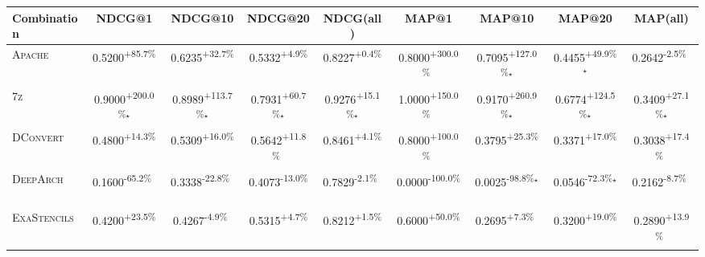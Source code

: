 \begin{table}[htbp]
\centering
\renewcommand{\arraystretch}{1.2}
\begin{tabular}{l|cccc|cccc}
\hline
Combination & NDCG@1 & NDCG@10 & NDCG@20 & NDCG(all) & MAP@1 & MAP@10 & MAP@20 & MAP(all) \\ \hline
\textsc{Apache} & \cellcolor{green!30}0.5200\textsuperscript{+85.7\%}$^{\,\,\,}$ & \cellcolor{green!30}0.6235\textsuperscript{+32.7\%}$^{\,\,\,}$ & \cellcolor{green!30}0.5332\textsuperscript{+4.9\%}$^{\,\,\,}$ & \cellcolor{green!30}0.8227\textsuperscript{+0.4\%}$^{\,\,\,}$ & \cellcolor{green!30}0.8000\textsuperscript{+300.0\%}$^{\,\,\,}$ & \cellcolor{green!30}0.7095\textsuperscript{+127.0\%}$^\star$ & \cellcolor{green!30}0.4455\textsuperscript{+49.9\%}$^\star$ & \cellcolor{red!30}0.2642\textsuperscript{-2.5\%}$^{\,\,\,}$ \\
\textsc{7z} & \cellcolor{green!30}0.9000\textsuperscript{+200.0\%}$^\star$ & \cellcolor{green!30}0.8989\textsuperscript{+113.7\%}$^\star$ & \cellcolor{green!30}0.7931\textsuperscript{+60.7\%}$^\star$ & \cellcolor{green!30}0.9276\textsuperscript{+15.1\%}$^\star$ & \cellcolor{green!30}1.0000\textsuperscript{+150.0\%}$^{\,\,\,}$ & \cellcolor{green!30}0.9170\textsuperscript{+260.9\%}$^\star$ & \cellcolor{green!30}0.6774\textsuperscript{+124.5\%}$^\star$ & \cellcolor{green!30}0.3409\textsuperscript{+27.1\%}$^\star$ \\
\textsc{DConvert} & \cellcolor{green!30}0.4800\textsuperscript{+14.3\%}$^{\,\,\,}$ & \cellcolor{green!30}0.5309\textsuperscript{+16.0\%}$^{\,\,\,}$ & \cellcolor{green!30}0.5642\textsuperscript{+11.8\%}$^{\,\,\,}$ & \cellcolor{green!30}0.8461\textsuperscript{+4.1\%}$^{\,\,\,}$ & \cellcolor{green!30}0.8000\textsuperscript{+100.0\%}$^{\,\,\,}$ & \cellcolor{green!30}0.3795\textsuperscript{+25.3\%}$^{\,\,\,}$ & \cellcolor{green!30}0.3371\textsuperscript{+17.0\%}$^{\,\,\,}$ & \cellcolor{green!30}0.3038\textsuperscript{+17.4\%}$^{\,\,\,}$ \\
\textsc{DeepArch} & \cellcolor{red!30}0.1600\textsuperscript{-65.2\%}$^{\,\,\,}$ & \cellcolor{red!30}0.3338\textsuperscript{-22.8\%}$^{\,\,\,}$ & \cellcolor{red!30}0.4073\textsuperscript{-13.0\%}$^{\,\,\,}$ & \cellcolor{red!30}0.7829\textsuperscript{-2.1\%}$^{\,\,\,}$ & \cellcolor{red!30}0.0000\textsuperscript{-100.0\%}$^{\,\,\,}$ & \cellcolor{red!30}0.0025\textsuperscript{-98.8\%}$^\star$ & \cellcolor{red!30}0.0546\textsuperscript{-72.3\%}$^\star$ & \cellcolor{red!30}0.2162\textsuperscript{-8.7\%}$^{\,\,\,}$ \\
\textsc{ExaStencils} & \cellcolor{green!30}0.4200\textsuperscript{+23.5\%}$^{\,\,\,}$ & \cellcolor{red!30}0.4267\textsuperscript{-4.9\%}$^{\,\,\,}$ & \cellcolor{green!30}0.5315\textsuperscript{+4.7\%}$^{\,\,\,}$ & \cellcolor{green!30}0.8212\textsuperscript{+1.5\%}$^{\,\,\,}$ & \cellcolor{green!30}0.6000\textsuperscript{+50.0\%}$^{\,\,\,}$ & \cellcolor{green!30}0.2695\textsuperscript{+7.3\%}$^{\,\,\,}$ & \cellcolor{green!30}0.3200\textsuperscript{+19.0\%}$^{\,\,\,}$ & \cellcolor{green!30}0.2890\textsuperscript{+13.9\%}$^{\,\,\,}$ \\

\end{tabular}
\end{table}
